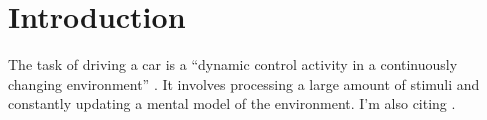 
\section{Introduction}\label{sec:introduction}
The task of driving a car is a ``dynamic control activity in a continuously changing environment'' \citep[p.~18]{DeWaard1996}.
It involves processing a large amount of stimuli and constantly updating a mental model of the environment.
I'm also citing \citet{Paxion2014}.